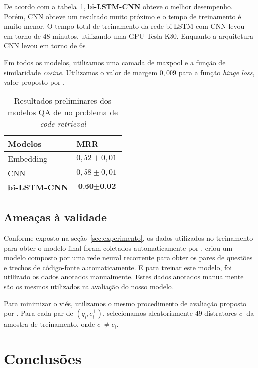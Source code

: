 \documentclass[12pt]{article}
\begin{document}
De acordo com a tabela~\ref{table:resultados-preliminares}, \textbf{bi-LSTM-CNN} obteve o melhor desempenho. Porém, CNN obteve um resultado muito próximo e o tempo de treinamento é muito menor. O tempo total de treinamento da rede bi-LSTM com CNN levou em torno de 48 minutos, utilizando uma GPU Tesla K80. Enquanto a arquitetura CNN levou em torno de 6s. 

Em todos os modelos, utilizamos uma camada de maxpool e a função de similaridade \textit{cosine}. Utilizamos o valor de margem $0,009$ para a função \textit{hinge loss}, valor proposto por \cite{feng-answer-selection-2015}.


\begin{table}[h]
\centering
\begin{tabular}{ |p{3cm}|p{3cm}|  }
 \hline
 \textbf{Modelos} & \textbf{MRR}\\
 \hline
 Embedding & $0,52 \pm 0,01$\\
 \hline
 CNN & $0,58 \pm 0,01 $ \\
 \hline
 \textbf{bi-LSTM-CNN} & $\textbf{0,60} \pm \textbf{0,02}$\\
 \hline
\end{tabular}
\caption{Resultados preliminares dos modelos QA de \cite{tan-lstm-qa} no problema de \textit{code retrieval}}
\label{table:resultados-preliminares}
\end{table}

\subsection{Ameaças à validade}

Conforme exposto na seção~\ref{sec:experimento}, os dados utilizados no treinamento para obter o modelo final foram coletados automaticamente por \cite{Yao-staqc:2018}. \cite{Yao-staqc:2018} criou um modelo composto por uma rede neural recorrente para obter os pares de questões e trechos de código-fonte automaticamente. E para treinar este modelo, foi utilizado os dados anotados manualmente. Estes dados anotados manualmente são os mesmos utilizados na avaliação do nosso modelo. 

Para minimizar o viés, utilizamos o mesmo procedimento de avaliação proposto por \cite{iyer-etal-2016-summarizing}. Para cada par de $(q_{i}, c_{i}^{+})$, selecionamos aleatoriamente 49 distratores $c^{'}$ da amostra de treinamento, onde $c^{'} \neq c_{i}$. 

\section{Conclusões}\label{sec:conclusao}
\end{document}
